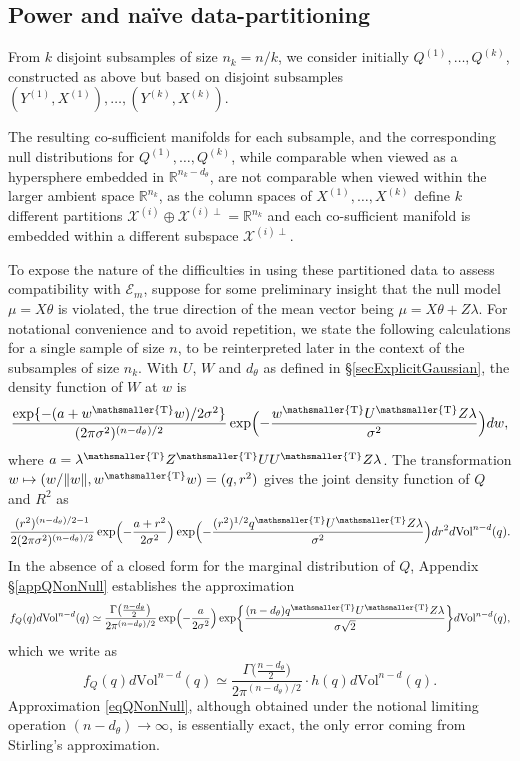 \documentclass[10pt, reqno]{amsart}
\numberwithin{equation}{section}
\newcommand{\RR}{\mathbb{R}}
\newcommand{\T}{{\mathsmaller {\rm T}}}
\begin{document}
 \begin{appendix}

 	\section{Power and na{\"ive} data-partitioning}\label{secPartitioning}

From $k$ disjoint subsamples of size $n_k=n/k$, we consider initially $Q^{(1)},\ldots,Q^{(k)}$, constructed as above but based on disjoint subsamples $(Y^{(1)},X^{(1)}),\ldots, (Y^{(k)},X^{(k)})$. 

The resulting co-sufficient manifolds for each subsample, and the corresponding null distributions for $Q^{(1)},\ldots,Q^{(k)}$, while comparable when viewed as a hypersphere embedded in $\RR^{n_k - d_\theta}$, are not comparable when viewed within the larger ambient space $\RR^{n_k}$, as the column spaces of $X^{(1)},\ldots, X^{(k)}$
define $k$ different partitions $\mathcal{X}^{(i)}\oplus\mathcal{X}^{(i)\perp}=\RR^{n_k}$ and each co-sufficient manifold is embedded within a different subspace $\mathcal{X}^{(i)\perp}$.



To expose the nature of the difficulties in using these partitioned data to assess compatibility with $\mathcal{E}_m$, suppose for some preliminary insight that the null model $\mu=X\theta$ is violated, the true direction of the mean vector being $\mu=X\theta + Z\lambda$. For notational convenience and to avoid repetition, we state the following calculations for a single sample of size $n$, to be reinterpreted later in the context of the subsamples of size $n_k$. With $U$, $W$ and $d_\theta$ as defined in \S\ref{secExplicitGaussian}, the density function of $W$ at $w$ is
%
\begin{equation}\label{eqWAlt}
	\frac{\exp\{-(a+w^\T w)/2\sigma^2\}}{(2\pi\sigma^2)^{(n-d_\theta)/2}}\exp\Bigl(-\frac{w^\T U^\T Z \lambda}{\sigma^2}\Bigr)dw,
\end{equation}
%
where $a=\lambda^\T Z^\T U U^\T Z \lambda$. The transformation $w\mapsto (w/\|w\|,w^\T w) = (q, r^2)$ gives the joint density function of $Q$ and $R^2$ as
\[
\frac{(r^2)^{(n-d_\theta)/2 -1}}{2(2\pi\sigma^2)^{(n-d_\theta)/2}} \exp\Bigl(-\frac{a+r^2}{2\sigma^2}\Bigr)\exp\Bigl(-\frac{(r^2)^{1/2}q^\T U^\T Z\lambda}{\sigma^2}\Bigr)dr^2 d \text{Vol}^{n-d}(q).
\]
In the absence of a closed form for the marginal distribution of $Q$, Appendix \S \ref{appQNonNull} establishes the approximation
%
\begin{equation}\label{eqQNonNull}
	f_Q(q)d\text{Vol}^{n-d}(q)  \simeq 
	\frac{\Gamma\bigl(\frac{n-d_\theta}{2}\bigr)}{2\pi^{(n-d_\theta)/2}}\exp\Bigl(-\frac{a}{2\sigma^2}\Bigr) \exp\biggl\{\frac{(n-d_\theta) q^\T U^\T Z\lambda}{\sigma\sqrt{2}}\biggr\}d \text{Vol}^{n-d}(q), 
\end{equation}
which we write as
\[
f_Q(q)d\text{Vol}^{n-d}(q) \simeq \frac{\Gamma\bigl(\frac{n-d_\theta}{2}\bigr)}{2\pi^{(n-d_\theta)/2}} \cdot h(q)d \text{Vol}^{n-d}(q).
\]
Approximation \eqref{eqQNonNull}, although obtained under the notional limiting operation $(n-d_\theta)\rightarrow \infty$, is essentially exact, the only error coming from Stirling's approximation.


\end{appendix}
\end{document}
